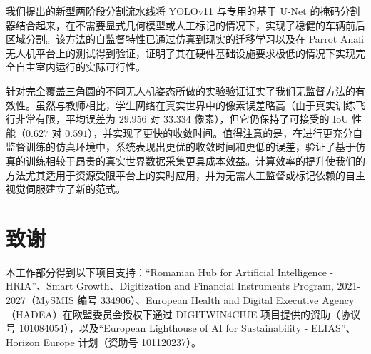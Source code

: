 \documentclass[10pt,twocolumn,letterpaper]{article}
\begin{document}
我们提出的新型两阶段分割流水线将 YOLOv11 与专用的基于 U-Net 的掩码分割器结合起来，在不需要显式几何模型或人工标记的情况下，实现了稳健的车辆前后区域分割。该方法的自监督特性已通过仿真到现实的迁移学习以及在 Parrot Anafi 无人机平台上的测试得到验证，证明了其在硬件基础设施要求极低的情况下实现完全自主室内运行的实际可行性。 

针对完全覆盖三角圆的不同无人机姿态所做的实验验证证实了我们无监督方法的有效性。虽然与教师相比，学生网络在真实世界中的像素误差略高（由于真实训练飞行非常有限，平均误差为 $29.956$ 对 $33.334$ 像素），但它仍保持了可接受的 IoU 性能（$0.627$ 对 $0.591$），并实现了更快的收敛时间。值得注意的是，在进行更充分自监督训练的仿真环境中，系统表现出更优的收敛时间和更低的误差，验证了基于仿真的训练相较于昂贵的真实世界数据采集更具成本效益。计算效率的提升使我们的方法尤其适用于资源受限平台上的实时应用，并为无需人工监督或标记依赖的自主视觉伺服建立了新的范式。

\section*{致谢} 
本工作部分得到以下项目支持：“Romanian Hub for Artificial Intelligence - HRIA”、Smart Growth、Digitization and Financial Instruments Program, 2021-2027（MySMIS 编号 334906）、European Health and Digital Executive Agency（HADEA）在欧盟委员会授权下通过 DIGITWIN4CIUE 项目提供的资助（协议号 101084054），以及“European Lighthouse of AI for Sustainability - ELIAS”、Horizon Europe 计划（资助号 101120237）。
{
\small


}
\end{document}
